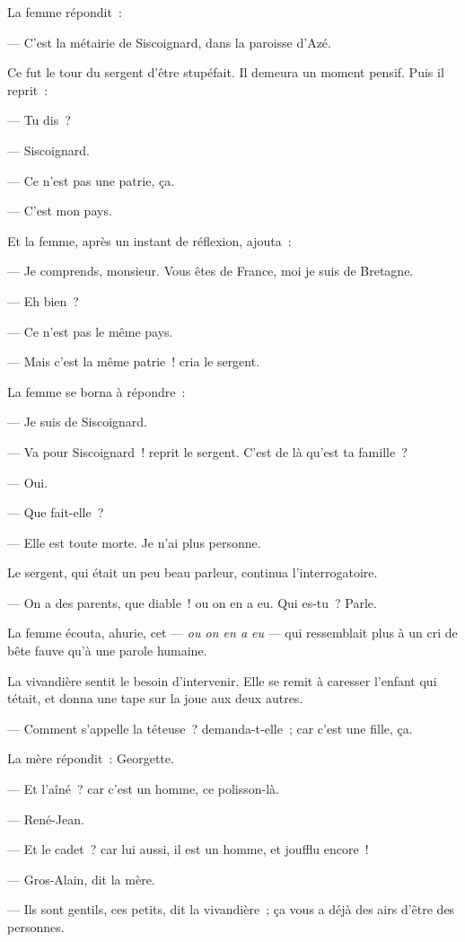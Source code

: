 \documentclass[french,twoside]{book} %
\begin{document}
La femme répondit :\par
— C’est la métairie de Siscoignard, dans la paroisse d’Azé.\par
Ce fut le tour du sergent d’être stupéfait. Il demeura un moment pensif. Puis il reprit :\par
— Tu dis ?\par
— Siscoignard.\par
— Ce n’est pas une patrie, ça.\par
— C’est mon pays.\par
Et la femme, après un instant de réflexion, ajouta :\par
— Je comprends, monsieur. Vous êtes de France, moi je suis de Bretagne.\par
 — Eh bien ?\par
— Ce n’est pas le même pays.\par
— Mais c’est la même patrie ! cria le sergent.\par
La femme se borna à répondre :\par
— Je suis de Siscoignard.\par
— Va pour Siscoignard ! reprit le sergent. C’est de là qu’est ta famille ?\par
— Oui.\par
— Que fait-elle ?\par
— Elle est toute morte. Je n’ai plus personne.\par
Le sergent, qui était un peu beau parleur, continua l’interrogatoire.\par
— On a des parents, que diable ! ou on en a eu. Qui es-tu ? Parle.\par
La femme écouta, ahurie, cet — \emph{ou on en a eu} — qui ressemblait plus à un cri de bête fauve qu’à une parole humaine.\par
La vivandière sentit le besoin d’intervenir. Elle se remit à caresser l’enfant qui tétait, et donna une tape sur la joue aux deux autres.\par
— Comment s’appelle la téteuse ? demanda-t-elle ; car c’est une fille, ça.\par
La mère répondit : Georgette.\par
— Et l’aîné ? car c’est un homme, ce polisson-là.\par
— René-Jean.\par
— Et le cadet ? car lui aussi, il est un homme, et joufflu encore !\par
— Gros-Alain, dit la mère.\par
— Ils sont gentils, ces petits, dit la vivandière ; ça vous a déjà des airs d’être des personnes.\par
\end{document}
